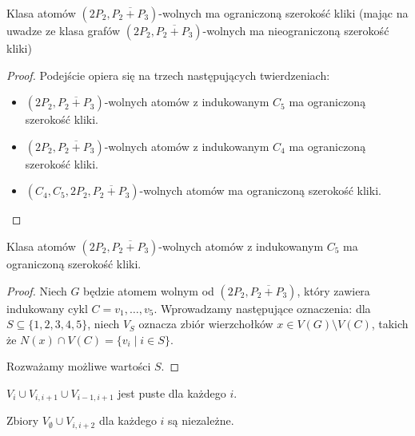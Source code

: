 \documentclass[polish]{beamer}
\begin{document}
\begin{frame}
    \begin{theorem}
        Klasa atomów $(2P_2, \overline{P_2 + P_3})$-wolnych ma ograniczoną szerokość kliki (mając na uwadze ze klasa grafów $(2P_2, \overline{P_2 + P_3})$-wolnych ma nieograniczoną szerokość kliki)
    \end{theorem}
    \begin{proof}
        \renewcommand{\qedsymbol}{}
        Podejście opiera się na trzech następujących twierdzeniach:
        \begin{itemize}
            \item $(2P_2, \overline{P_2 + P_3})$-wolnych atomów z indukowanym $C_5$ ma ograniczoną szerokość kliki.
            \item $(2P_2, \overline{P_2 + P_3})$-wolnych atomów z indukowanym $C_4$ ma ograniczoną szerokość kliki.
            \item $(C_4, C_5, 2P_2, \overline{P_2 + P_3})$-wolnych atomów ma ograniczoną szerokość kliki.
        \end{itemize}
    \end{proof}
\end{frame}

\begin{frame}
    \begin{lemma}
        Klasa atomów $(2P_2, \overline{P_2 + P_3})$-wolnych atomów z indukowanym $C_5$ ma ograniczoną szerokość kliki.
    \end{lemma}
    \begin{proof}
        \renewcommand{\qedsymbol}{}
        Niech $G$ będzie atomem wolnym od $(2P_2, \overline{P_2 + P_3})$, który zawiera indukowany cykl $C = v_1, \dots, v_5$. Wprowadzamy następujące oznaczenia: dla $S \subseteq \{1, 2, 3, 4, 5\}$, niech $V_S$ oznacza zbiór wierzchołków $x \in V(G) \setminus V(C)$, takich że $N(x) \cap V(C) = \{v_i \mid i \in S\}$.
        
        Rozważamy możliwe wartości $S$.
    \end{proof}
\end{frame}

\begin{frame}
    \begin{theorem}
        \renewcommand{\qedsymbol}{}
        $V_i \cup V_{i,i+1} \cup V_{i-1,i+1}$ jest puste dla każdego $i$.
    \end{theorem}
    \graphBigger
\end{frame}

\begin{frame}
    \begin{theorem}
        \renewcommand{\qedsymbol}{}
        Zbiory $V_\emptyset \cup V_{i,i+2}$ dla każdego $i$ są niezależne.
    \end{theorem}
    \graphBigger
\end{frame}
\end{document}
